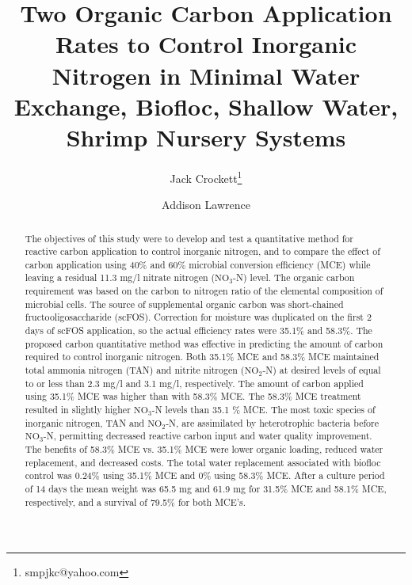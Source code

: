 \documentclass[useAMS,usenatbib]{tellus}
\begin{document}

\title[Two Organic Carbon Application Rates]{Two Organic Carbon Application Rates to Control Inorganic Nitrogen in Minimal Water Exchange, Biofloc, Shallow Water, Shrimp Nursery Systems}

\author[1]{Jack Crockett\thanks{smpjkc@yahoo.com}}
\author[1, 2, 3]{Addison Lawrence}

\maketitle

\begin{abstract}
The objectives of this study were to develop and test a quantitative method for reactive carbon application to control inorganic nitrogen, and to compare the effect of carbon application using 40\% and 60\% microbial conversion efficiency (MCE) while leaving a residual 11.3 mg/l nitrate nitrogen ($\text{NO}_3$-N) level. The organic carbon requirement was based on the carbon to nitrogen ratio of the elemental composition of microbial cells. The source of supplemental organic carbon was short-chained fructooligosaccharide (scFOS). Correction for moisture was duplicated on the first 2 days of scFOS application, so the actual efficiency rates were 35.1\% and 58.3\%. The proposed carbon quantitative method was effective in predicting the amount of carbon required to control inorganic nitrogen.  Both 35.1\% MCE and 58.3\% MCE maintained total ammonia nitrogen (TAN) and nitrite nitrogen ($\text{NO}_2$-N) at desired levels of equal to or less than 2.3 mg/l and 3.1 mg/l, respectively.  The amount of carbon applied using 35.1\% MCE was higher than with 58.3\% MCE. The 58.3\% MCE treatment resulted in slightly higher $\text{NO}_3$-N levels than 35.1 \% MCE. The most toxic species of inorganic nitrogen, TAN and $\text{NO}_2$-N, are assimilated by heterotrophic bacteria before $\text{NO}_3$-N, permitting decreased reactive carbon input and water quality improvement. The benefits of 58.3\% MCE vs. 35.1\% MCE were lower organic loading, reduced water replacement, and decreased costs.  The total water replacement associated with biofloc control was 0.24\% using 35.1\% MCE and 0\% using 58.3\% MCE. After a culture period of 14 days the mean weight was 65.5 mg and 61.9 mg for 31.5\% MCE and 58.1\% MCE, respectively, and a survival of 79.5\% for both MCE's.
\end{abstract}
\end{document}
